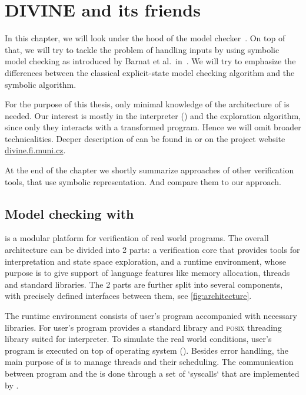 \chapter{DIVINE and its friends}\label{ch:divine}

In this chapter, we will look under the hood of the \DIVINE model
checker~\cite{Divine17}.  On top of that, we will try to tackle the problem of
handling inputs by using symbolic model checking as introduced by Barnat et
al.~in~\cite{Barnat14}. We will try to emphasize the differences between the
classical explicit-state model checking algorithm and the symbolic algorithm.

For the purpose of this thesis, only minimal knowledge of the architecture of
\DIVINE is needed. Our interest is mostly in the \LLVM interpreter (\DIVM) and
the exploration algorithm, since only they interacts with a transformed program.
Hence we will omit broader technicalities.  Deeper description of \DIVINE can be
found in \cite{Divine17} or on the project website
\href{https://divine.fi.muni.cz/}{divine.fi.muni.cz}.

At the end of the chapter we shortly summarize approaches of other verification
tools, that use symbolic representation. And compare them to our approach.

\section{Model checking with \DIVINE}


\DIVINE is a modular platform for verification of real world programs.  The
overall architecture can be divided into 2 parts: a verification core that
provides tools for \LLVM interpretation and state space exploration, and a
runtime environment, whose purpose is to give support of language features like
memory allocation, threads and standard libraries. The 2 parts are further split
into several components, with precisely defined interfaces between them, see
\autoref{fig:architecture}.

The runtime environment consists of user's program accompanied with necessary
libraries. For user's program \DIVINE provides a \Cpp{} standard library and
\textsc{posix} threading library suited for \DIVINE interpreter. To simulate the
real world conditions, user's program is executed on top of \DIVINE
operating system (\DIOS). Besides error handling, the main purpose of \DIOS is
to manage threads and their scheduling. The communication between program and
the \DIOS is done through a set of `syscalls` that are implemented by \DIOS.

